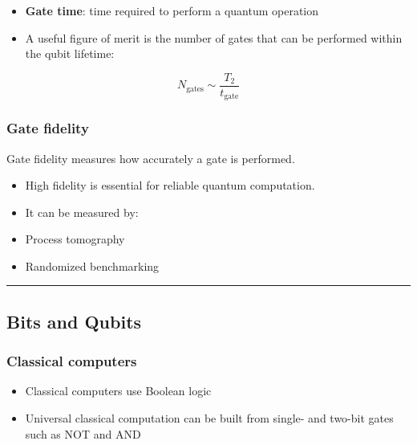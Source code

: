 \documentclass[
]{article}
\providecommand{\tightlist}{%
  \setlength{\itemsep}{0pt}\setlength{\parskip}{0pt}}
\begin{document}
\begin{itemize}
\tightlist
\item
  \textbf{Gate time}: time required to perform a quantum operation
\item
  A useful figure of merit is the number of gates that can be performed
  within the qubit lifetime:
\end{itemize}

\[
N_{\text{gates}} \sim \frac{T_2}{t_{\text{gate}}}
\]

\subsubsection{Gate fidelity}\label{gate-fidelity}

Gate fidelity measures how accurately a gate is performed.

\begin{itemize}
\tightlist
\item
  High fidelity is essential for reliable quantum computation.
\item
  It can be measured by:
\end{itemize}

\begin{itemize}
\tightlist
\item
  Process tomography
\item
  Randomized benchmarking
\end{itemize}

\begin{center}\rule{0.5\linewidth}{0.5pt}\end{center}

\subsection{Bits and Qubits}\label{bits-and-qubits}

\subsubsection{Classical computers}\label{classical-computers-1}

\begin{itemize}
\tightlist
\item
  Classical computers use Boolean logic
\item
  Universal classical computation can be built from single- and two-bit
  gates such as NOT and AND
\end{itemize}
\end{document}
